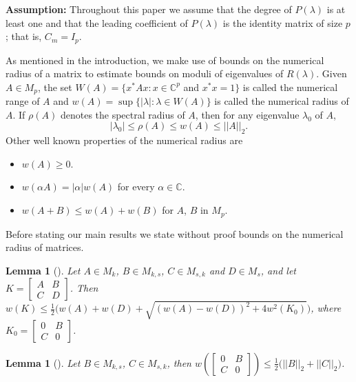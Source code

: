 \documentclass[12pt, reqno]{amsart}
\newtheorem{lemma}[theorem]{Lemma}
\theoremstyle{definition}
\theoremstyle{remark}
\numberwithin{equation}{section}
\begin{document}
\noindent 
\textbf{Assumption:} Throughout this paper we assume that the degree of 
$P(\lambda)$ is at least one and that the leading coefficient of $P(\lambda)$ is 
the identity matrix of size $p$; that is, $C_m=I_p$. 

\medskip
As mentioned in the introduction, we make use of bounds on the numerical radius of a matrix 
to estimate bounds on moduli of eigenvalues of $R(\lambda)$. Given $A \in M_p$, the set 
$W(A) = \{ x^*Ax : x \in \mathbb{C}^p$ and  $x^*x=1\}$ is called the numerical range of 
$A$ and $w(A) = \sup \{ |\lambda| : \lambda \in W(A) \}$ is called the numerical radius 
of $A$. If $\rho(A)$ denotes the spectral radius of $A$, then for any eigenvalue $\lambda_0$ 
of $A$, 
\begin{equation}\label{numerical radius-relationship}
|\lambda_0| \leq \rho(A) \leq w(A) \leq ||A||_2.
\end{equation}
Other well known properties of the numerical radius are  
\begin{itemize}
\item $w(A) \geq 0$.
\item $w(\alpha A) = |\alpha| w(A)$ for every $\alpha \in \mathbb{C}$.
\item $w(A+B) \leq w(A)+w(B)$ for $A$, $B$ in $M_p$. 
\end{itemize}

\medskip
Before stating our main results we state without proof bounds on the numerical radius 
of matrices.

\begin{lemma}[\cite{Abu-Omar}] \label{Lem-numerical radius-1}
Let $A \in M_k$, $B \in M_{k,s}$, $C \in M_{s,k}$ and $D \in M_{s}$, and 
let $K = \begin{bmatrix}
A & B \\
C & D
\end{bmatrix}$. Then 
$w(K) \leq \displaystyle \frac{1}{2} \Big(w(A)+ w(D) +\sqrt{(w(A)-w(D))^2+ 4w^2(K_0)}\Big)$,
where $K_0 = \begin{bmatrix}
0 & B \\
C & 0
\end{bmatrix}$. 
\end{lemma}

\begin{lemma}[\cite{Yamazaki}]\label{Lem-numerical radius-2}
Let $B \in M_{k,s}$, $C \in M_{s,k}$, then
$\displaystyle w\left(\begin{bmatrix}
0 & B \\
C & 0
\end{bmatrix}\right) \leq \frac{1}{2}\big(||B||_2+ ||C||_2 \big)$.
\end{lemma}
\end{document}
